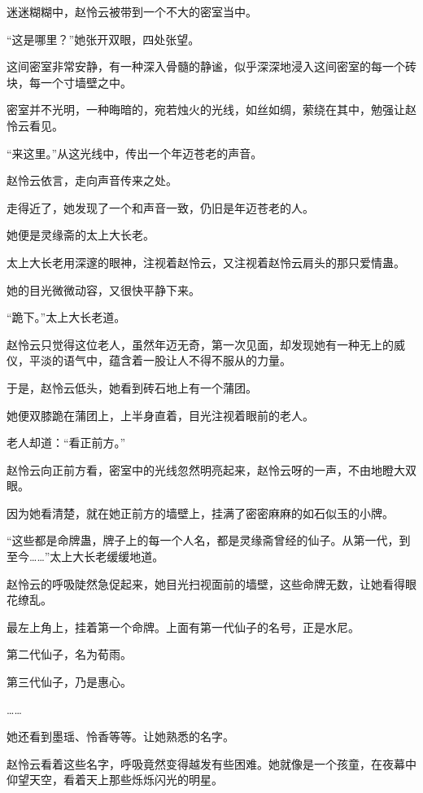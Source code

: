 
\begin{this_body}

迷迷糊糊中，赵怜云被带到一个不大的密室当中。

“这是哪里？”她张开双眼，四处张望。

这间密室非常安静，有一种深入骨髓的静谧，似乎深深地浸入这间密室的每一个砖块，每一个寸墙壁之中。

密室并不光明，一种晦暗的，宛若烛火的光线，如丝如绸，萦绕在其中，勉强让赵怜云看见。

“来这里。”从这光线中，传出一个年迈苍老的声音。

赵怜云依言，走向声音传来之处。

走得近了，她发现了一个和声音一致，仍旧是年迈苍老的人。

她便是灵缘斋的太上大长老。

太上大长老用深邃的眼神，注视着赵怜云，又注视着赵怜云肩头的那只爱情蛊。

她的目光微微动容，又很快平静下来。

“跪下。”太上大长老道。

赵怜云只觉得这位老人，虽然年迈无奇，第一次见面，却发现她有一种无上的威仪，平淡的语气中，蕴含着一股让人不得不服从的力量。

于是，赵怜云低头，她看到砖石地上有一个蒲团。

她便双膝跪在蒲团上，上半身直着，目光注视着眼前的老人。

老人却道：“看正前方。”

赵怜云向正前方看，密室中的光线忽然明亮起来，赵怜云呀的一声，不由地瞪大双眼。

因为她看清楚，就在她正前方的墙壁上，挂满了密密麻麻的如石似玉的小牌。

“这些都是命牌蛊，牌子上的每一个人名，都是灵缘斋曾经的仙子。从第一代，到至今……”太上大长老缓缓地道。

赵怜云的呼吸陡然急促起来，她目光扫视面前的墙壁，这些命牌无数，让她看得眼花缭乱。

最左上角上，挂着第一个命牌。上面有第一代仙子的名号，正是水尼。

第二代仙子，名为荀雨。

第三代仙子，乃是惠心。

……

她还看到墨瑶、怜香等等。让她熟悉的名字。

赵怜云看着这些名字，呼吸竟然变得越发有些困难。她就像是一个孩童，在夜幕中仰望天空，看着天上那些烁烁闪光的明星。


\end{this_body}
